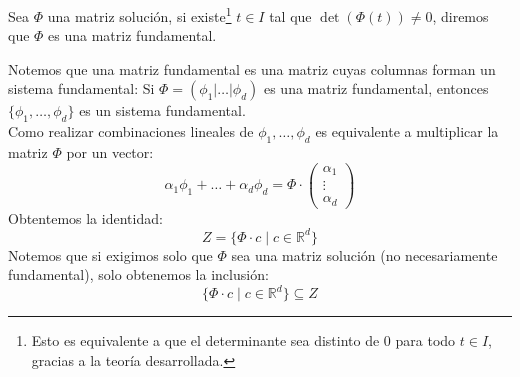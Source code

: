 \begin{definicion}
    Sea $\Phi$ una matriz solución, si existe\footnote{Esto es equivalente a que el determinante sea distinto de 0 para todo $t\in I$, gracias a la teoría desarrollada.} $t\in I$ tal que $\det(\Phi(t)) \neq 0$, diremos que $\Phi$ es una matriz fundamental.
\end{definicion}

\begin{observacion}
    Notemos que una matriz fundamental es una matriz cuyas columnas forman un sistema fundamental: Si $\Phi=(\phi_1|\ldots|\phi_d)$ es una matriz fundamental, entonces $\{\phi_1,\ldots,\phi_d\}$ es un sistema fundamental.\\

    \noindent
    Como realizar combinaciones lineales de $\phi_1,\ldots,\phi_d$ es equivalente a multiplicar la matriz $\Phi$ por un vector:
    \begin{equation*}
        \alpha_1 \phi_1 + \ldots + \alpha_d \phi_d = \Phi\cdot 
        \left(\begin{array}{c}
            \alpha_1 \\
            \vdots \\
            \alpha_d
        \end{array}\right)
    \end{equation*}
    Obtentemos la identidad:
    \begin{equation*}
        Z = \{\Phi\cdot c \mid c\in \mathbb{R}^d\}
    \end{equation*}
    Notemos que si exigimos solo que $\Phi$ sea una matriz solución (no necesariamente fundamental), solo obtenemos la inclusión:
    \begin{equation*}
        \{\Phi\cdot c \mid c\in \mathbb{R}^d\} \subseteq Z
    \end{equation*}
\end{observacion}

